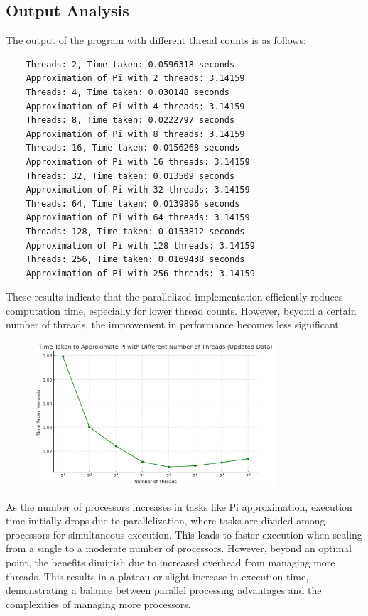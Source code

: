 \documentclass[11pt]{article}
\begin{document}
    \subsection{Output Analysis}
    The output of the program with different thread counts is as follows:
    \begin{verbatim}
    Threads: 2, Time taken: 0.0596318 seconds
    Approximation of Pi with 2 threads: 3.14159
    Threads: 4, Time taken: 0.030148 seconds
    Approximation of Pi with 4 threads: 3.14159
    Threads: 8, Time taken: 0.0222797 seconds
    Approximation of Pi with 8 threads: 3.14159
    Threads: 16, Time taken: 0.0156268 seconds
    Approximation of Pi with 16 threads: 3.14159
    Threads: 32, Time taken: 0.013509 seconds
    Approximation of Pi with 32 threads: 3.14159
    Threads: 64, Time taken: 0.0139896 seconds
    Approximation of Pi with 64 threads: 3.14159
    Threads: 128, Time taken: 0.0153812 seconds
    Approximation of Pi with 128 threads: 3.14159
    Threads: 256, Time taken: 0.0169438 seconds
    Approximation of Pi with 256 threads: 3.14159
    \end{verbatim}
    These results indicate that the parallelized implementation efficiently reduces computation time, especially for lower thread counts. However, beyond a certain number of threads, the improvement in performance becomes less significant.

    \begin{figure}[h]
        \centering
        \includegraphics[width=0.8\textwidth]{img/exectime.png}
        \label{fig:execution_times}
    \end{figure}

    As the number of processors increases in tasks like Pi approximation, execution time initially drops due to parallelization, where tasks are divided among processors for simultaneous execution. This leads to faster execution when scaling from a single to a moderate number of processors. However, beyond an optimal point, the benefits diminish due to increased overhead from managing more threads. This results in a plateau or slight increase in execution time, demonstrating a balance between parallel processing advantages and the complexities of managing more processors.
\end{document}
